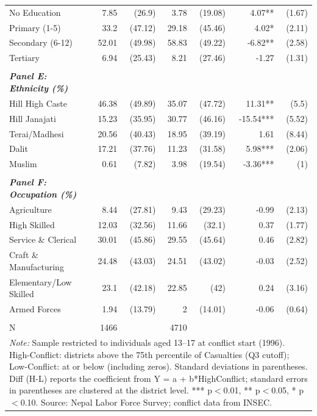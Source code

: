 \begin{landscape}
\begin{table}[!h]
{\begin{tabular}[t]{lrrrrrr}
No Education & 7.85 & (26.9) & 3.78 & (19.08) & 4.07** & (1.67)\\
Primary (1-5) & 33.2 & (47.12) & 29.18 & (45.46) & 4.02* & (2.11)\\
\addlinespace
Secondary (6-12) & 52.01 & (49.98) & 58.83 & (49.22) & -6.82** & (2.58)\\
Tertiary & 6.94 & (25.43) & 8.21 & (27.46) & -1.27 & (1.31)\\
 &  &  &  &  &  & \\
\em{\textbf{Panel E: Ethnicity (\%)}} & \em{\textbf{}} & \em{\textbf{}} & \em{\textbf{}} & \em{\textbf{}} & \em{\textbf{}} & \em{\textbf{}}\\
Hill High Caste & 46.38 & (49.89) & 35.07 & (47.72) & 11.31** & (5.5)\\
\addlinespace
Hill Janajati & 15.23 & (35.95) & 30.77 & (46.16) & -15.54*** & (5.52)\\
Terai/Madhesi & 20.56 & (40.43) & 18.95 & (39.19) & 1.61 & (8.44)\\
Dalit & 17.21 & (37.76) & 11.23 & (31.58) & 5.98*** & (2.06)\\
Muslim & 0.61 & (7.82) & 3.98 & (19.54) & -3.36*** & (1)\\
 &  &  &  &  &  & \\
\addlinespace
\em{\textbf{Panel F: Occupation (\%)}} & \em{\textbf{}} & \em{\textbf{}} & \em{\textbf{}} & \em{\textbf{}} & \em{\textbf{}} & \em{\textbf{}}\\
Agriculture & 8.44 & (27.81) & 9.43 & (29.23) & -0.99 & (2.13)\\
High Skilled & 12.03 & (32.56) & 11.66 & (32.1) & 0.37 & (1.77)\\
Service \& Clerical & 30.01 & (45.86) & 29.55 & (45.64) & 0.46 & (2.82)\\
Craft \& Manufacturing & 24.48 & (43.03) & 24.51 & (43.02) & -0.03 & (2.52)\\
\addlinespace
Elementary/Low Skilled & 23.1 & (42.18) & 22.85 & (42) & 0.24 & (3.16)\\
Armed Forces & 1.94 & (13.79) & 2 & (14.01) & -0.06 & (0.64)\\
 &  &  &  &  &  & \\
N & 1466 &  & 4710 &  &  & \\
\bottomrule
\multicolumn{7}{l}{\rule{0pt}{1em}\textit{Note: } Sample restricted to individuals aged 13--17 at conflict start (1996). High-Conflict: districts above the 75th percentile of Casualties (Q3 cutoff); Low-Conflict: at or below (including zeros). Standard deviations in parentheses. Diff (H-L) reports the coefficient from Y = a + b*HighConflict; standard errors in parentheses are clustered at the district level. *** p$<$0.01, ** p$<$0.05, * p$<$0.10. Source: Nepal Labor Force Survey; conflict data from INSEC.}\\
\end{tabular}}
\end{table}
\end{landscape}
